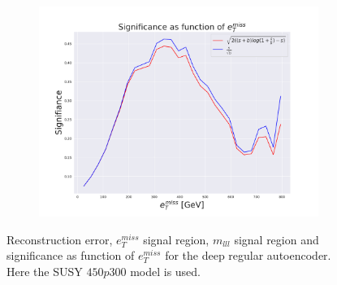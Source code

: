 \begin{figure}[H]
    \hfill  
    \begin{subfigure}{.40\textwidth}
        \includegraphics[width=\textwidth]{Figures/AE_testing/small/2lep/significance_etmiss_450p0p0300_-0.8583753266807368.pdf}
        \caption{}
        \label{fig:AE_2lep_small_signi_450_3}
    \end{subfigure}
    \hfill      
    \caption[2lep shallow network | $450p300$ | AE | 3]{Reconstruction error, $e_T^{miss}$ signal region, $m_{lll}$ signal region and significance as function of 
    $e_T^{miss}$ for the deep regular autoencoder. Here the SUSY $450p300$ model is used.}
    \label{fig:AE_2lep_small_rec_sig_signi_450_3}
\end{figure}


